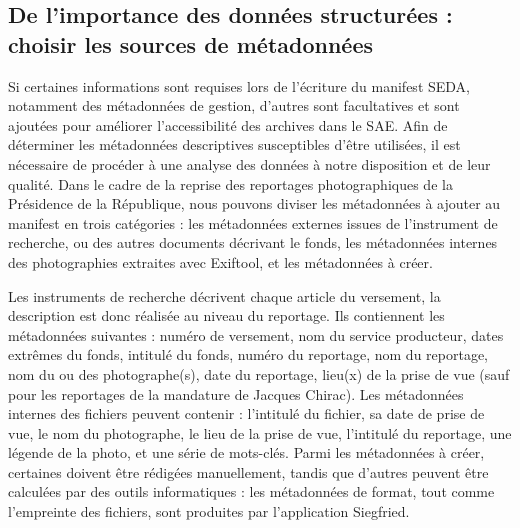 \subsection*{De l'importance des données structurées : choisir les sources de métadonnées}
Si certaines informations sont requises lors de l'écriture du manifest SEDA, notamment des métadonnées de gestion, d'autres sont facultatives et sont ajoutées pour améliorer l'accessibilité des archives dans le SAE. Afin de déterminer les métadonnées descriptives susceptibles d'être utilisées, il est nécessaire de procéder à une analyse des données à notre disposition et de leur qualité. Dans le cadre de la reprise des reportages photographiques de la Présidence de la République, nous pouvons diviser les métadonnées à ajouter au manifest en trois catégories : les métadonnées externes issues de l'instrument de recherche, ou des autres documents décrivant le fonds, les métadonnées internes des photographies extraites avec Exiftool, et les métadonnées à créer.

Les instruments de recherche décrivent chaque article du versement, la description est donc réalisée au niveau du reportage. Ils contiennent les métadonnées suivantes : numéro de versement, nom du service producteur, dates extrêmes du fonds, intitulé du fonds, numéro du reportage, nom du reportage, nom du ou des photographe(s), date du reportage, lieu(x) de la prise de vue (sauf pour les reportages de la mandature de Jacques Chirac). Les métadonnées internes des fichiers peuvent contenir : l'intitulé du fichier, sa date de prise de vue, le nom du photographe, le lieu de la prise de vue, l'intitulé du reportage, une légende de la photo, et une série de mots-clés. Parmi les métadonnées à créer, certaines doivent être rédigées manuellement, tandis que d'autres peuvent être calculées par des outils informatiques : les métadonnées de format, tout comme l'empreinte des fichiers, sont produites par l'application Siegfried. 


